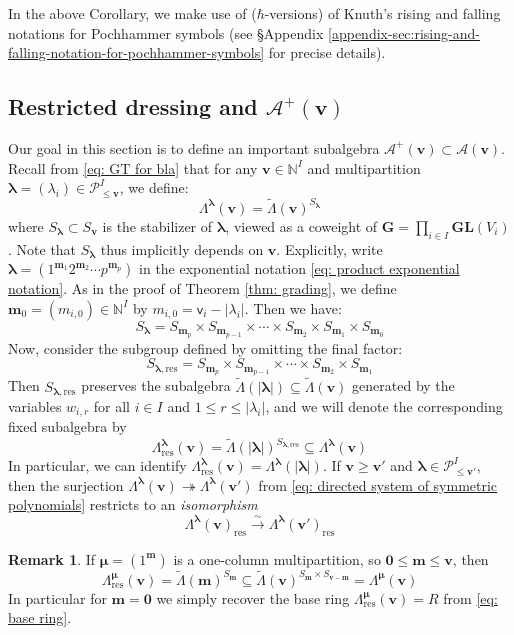 \documentclass[11pt,reqno]{amsart}
\renewcommand{\mathbf}{\mathbold}
\numberwithin{equation}{section}
\theoremstyle{definition}
\newtheorem{Remark}[equation]{Remark}
\newcommand{\cA}{\mathcal{A}}
\newcommand{\bG}{\mathbf{G}}
\newcommand{\cP}{\mathcal{P}}
\newcommand{\bm}{\mathbf{m}}
\newcommand{\bv}{\mathbf{v}}
\newcommand{\NN}{\mathbb{N}}
\newcommand{\GL}{\mathbf{GL}}
\renewcommand{\bv}{\mathbf{v}} %
\newcommand{\sv}{\mathsf{v}}
\newcommand{\vertexset}{I}
\newcommand{\GT}{\Lambda}
\newcommand{\tGT}{\widetilde{\Lambda}}
\newcommand{\base}{R}
\newcommand{\Partitions}{\cP}
\newcommand{\la}{\lambda}
\newcommand{\bla}{{\boldsymbol{\lambda}}}
\newcommand{\bmu}{{\boldsymbol{\mu}}}
\newcommand{\qzast}{\cA}
\newcommand{\qzastplus}{\cA^{+}}
\newcommand{\res}{\mathrm{res}}
\begin{document}
In the above Corollary, we make use of ($\hbar$-versions) of Knuth's rising and falling notations for Pochhammer symbols (see \S Appendix \ref{appendix-sec:rising-and-falling-notation-for-pochhammer-symbols} for precise details).

\subsection{Restricted dressing and $\qzastplus(\bv)$}
\label{ssec: restricted dressing and positive part}

Our goal in this section is to define an important subalgebra $\qzastplus(\bv) \subset \qzast(\bv)$.  Recall from \eqref{eq: GT for bla}  that for any $\bv \in \NN^\vertexset$ and multipartition $\bla  = (\la_i)\in \Partitions_{\leq \bv}^\vertexset$, we define:
$$
\GT^\bla(\bv) = \tGT(\bv)^{S_\bla}
$$
where $S_\bla \subset S_\bv$ is the stabilizer of $\bla$, viewed as a coweight of $\bG = \prod_{i\in \vertexset} \GL(V_i)$.  Note that $S_\bla$ thus implicitly depends on $\bv$.  Explicitly, write $\bla =  (1^{\bm_1} 2^{\bm_2} \cdots p^{\bm_p})$ in the exponential notation \eqref{eq: product exponential notation}. As in the proof of Theorem \ref{thm: grading}, we define $\bm_0 = (m_{i,0}) \in \NN^\vertexset$ by $m_{i,0} = \sv_i - |\la_i|$. Then we have:
\begin{equation}
    \label{eq:Sbladefined}
    S_\bla = S_{\bm_p} \times S_{\bm_{p-1}} \times \cdots \times S_{\bm_2} \times S_{\bm_1} \times S_{\bm_0}
\end{equation}
Now, consider the subgroup defined by omitting the final factor:
\begin{equation}
    S_{\bla, \res} = S_{\bm_p} \times S_{\bm_{p-1}} \times \cdots \times S_{\bm_2} \times S_{\bm_1}
\end{equation}
Then  $S_{\bla, \res}$ preserves the subalgebra $\tGT(|\bla|) \subseteq \tGT(\bv)$ generated by the variables $w_{i,r}$ for all $i \in \vertexset$ and  $1 \leq r \leq |\la_i|$, and we will denote the corresponding fixed subalgebra by 
\begin{equation}
    \GT_{\res}^\bla(\bv) = \tGT(|\bla|)^{S_{\bla,\res}} \subseteq \GT^\bla(\bv)
\end{equation}
In particular, we can identify  $\GT_{\res}^\bla(\bv) = \GT^\bla(|\bla|)$. If $\bv \geq \bv'$ and $\bla \in \Partitions_{\leq \bv'}^\vertexset$, then the surjection $\GT^\bla(\bv) \twoheadrightarrow \GT^\bla(\bv')$ from \eqref{eq: directed system of symmetric polynomials} restricts to an \emph{isomorphism} 
\begin{equation}
    \label{eq: directed system of restricted symmetric polynomials}
    \GT^\bla(\bv)_\res \stackrel{\sim}{\longrightarrow} \GT^\bla(\bv')_\res
\end{equation}
\begin{Remark}
If $\bmu = (1^\bm)$ is a one-column multipartition, so $\mathbf{0} \leq \bm \leq \bv$, then 
$$
    \GT_{\res}^\bmu(\bv) = \tGT(\bm)^{S_\bm} \subseteq \tGT(\bv)^{S_\bm \times S_{\bv-\bm}} = \GT^\bmu(\bv)
$$
In particular for $\bm = \mathbf{0}$ we simply recover the base ring $\GT_{\res}^\bmu(\bv) = \base$ from \eqref{eq: base ring}.
\end{Remark}
\end{document}
